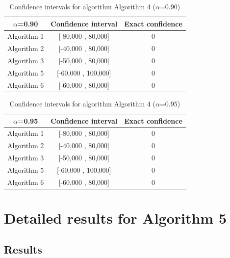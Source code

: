 \documentclass[a4paper,10pt]{article}
\begin{document}
\begin{table}[!htp]
\centering\small
\begin{tabular}{
|c|c|c|}
\hline
 $\alpha$=0.90 & Confidence interval & Exact confidence \\ \hline 
Algorithm 1 & [-80,000 , 80,000] & 0\\ \hline 
Algorithm 2 & [-40,000 , 80,000] & 0\\ \hline 
Algorithm 3 & [-50,000 , 80,000] & 0\\ \hline 
Algorithm 5 & [-60,000 , 100,000] & 0\\ \hline 
Algorithm 6 & [-60,000 , 80,000] & 0\\ \hline 

\end{tabular}
\caption{Confidence intervals for algorithm Algorithm 4 ($\alpha$=0.90)}
\end{table}
\begin{table}[!htp]
\centering\small
\begin{tabular}{
|c|c|c|}
\hline
 $\alpha$=0.95 & Confidence interval & Exact confidence \\ \hline 
Algorithm 1 & [-80,000 , 80,000] & 0\\ \hline 
Algorithm 2 & [-40,000 , 80,000] & 0\\ \hline 
Algorithm 3 & [-50,000 , 80,000] & 0\\ \hline 
Algorithm 5 & [-60,000 , 100,000] & 0\\ \hline 
Algorithm 6 & [-60,000 , 80,000] & 0\\ \hline 

\end{tabular}
\caption{Confidence intervals for algorithm Algorithm 4 ($\alpha$=0.95)}
\end{table}

 \clearpage 


\section{Detailed results for Algorithm 5}


\subsection{Results}
\end{document}
